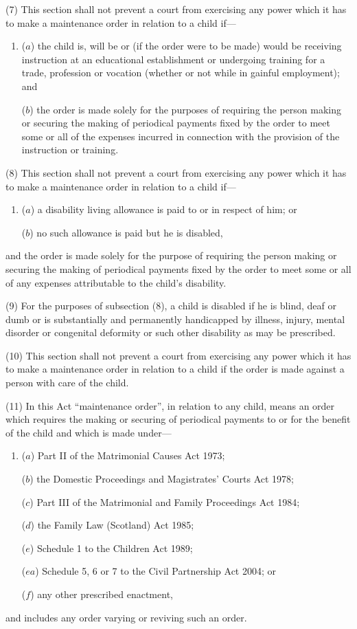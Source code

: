 \documentclass[12pt,a4paper]{article}
\begin{document}
(7) This section shall not prevent a court from exercising any power which it has to make a maintenance order in relation to a child if—
\begin{enumerate}\item[]
($a$) the child is, will be or (if the order were to be made) would be receiving instruction at an educational establishment or undergoing training for a trade, profession or vocation (whether or not while in gainful employment); and

($b$) the order is made solely for the purposes of requiring the person making or securing the making of periodical payments fixed by the order to meet some or all of the expenses incurred in connection with the provision of the instruction or training.
\end{enumerate}

(8) This section shall not prevent a court from exercising any power which it has to make a maintenance order in relation to a child if—
\begin{enumerate}\item[]
($a$) a disability living allowance is paid to or in respect of him; or

($b$) no such allowance is paid but he is disabled,
\end{enumerate}
and the order is made solely for the purpose of requiring the person making or securing the making of periodical payments fixed by the order to meet some or all of any expenses attributable to the child’s disability.

(9) For the purposes of subsection (8), a child is disabled if he is blind, deaf or dumb or is substantially and permanently handicapped by illness, injury, mental disorder or congenital deformity or such other disability as may be prescribed.

(10) This section shall not prevent a court from exercising any power which it has to make a maintenance order in relation to a child if the order is made against a person with care of the child.

(11) In this Act “maintenance order”, in relation to any child, means an order which requires the making or securing of periodical payments to or for the benefit of the child and which is made under—
\begin{enumerate}\item[]
($a$) Part II of the Matrimonial Causes Act 1973;

($b$) the Domestic Proceedings and Magistrates' Courts Act 1978;

($c$) Part III of the Matrimonial and Family Proceedings Act 1984;

($d$) the Family Law (Scotland) Act 1985;

($e$) Schedule 1 to the Children Act 1989; 

($ea$) Schedule 5, 6 or 7 to the Civil Partnership Act 2004; or

($f$) any other prescribed enactment,
\end{enumerate}
and includes any order varying or reviving such an order.
\end{document}
